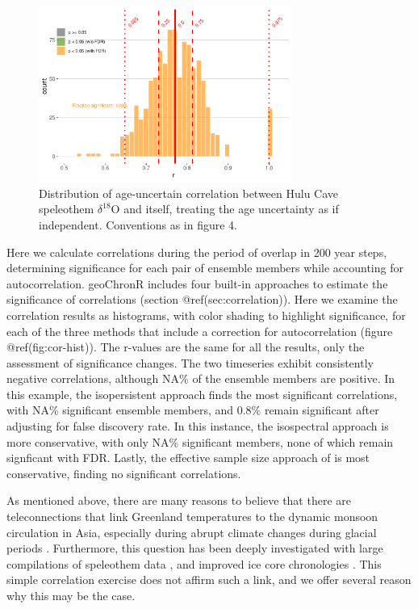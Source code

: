 \documentclass[gchron, manuscript]{copernicus}
\begin{document}
\begin{figure}
\includegraphics[width=8.3cm]{geoChronR-paper_files/figure-latex/hulu-cor-hist-1} \caption{Distribution of age-uncertain correlation between Hulu Cave speleothem $\delta^{18}$O and itself, treating the age uncertainty as if independent. Conventions as in figure 4.}\label{fig:hulu-cor-hist}
\end{figure}

Here we calculate correlations during the period of overlap in 200 year
steps, determining significance for each pair of ensemble members while
accounting for autocorrelation. geoChronR includes four built-in
approaches to estimate the significance of correlations (section
@ref(sec:correlation)). Here we examine the correlation results as
histograms, with color shading to highlight significance, for each of
the three methods that include a correction for autocorrelation (figure
@ref(fig:cor-hist)). The r-values are the same for all the results, only
the assessment of significance changes. The two timeseries exhibit
consistently negative correlations, although NA\% of the ensemble
members are positive. In this example, the isopersistent approach finds
the most significant correlations, with NA\% significant ensemble
members, and 0.8\% remain significant after adjusting for false
discovery rate. In this instance, the isospectral approach is more
conservative, with only NA\% significant members, none of which remain
signficant with FDR. Lastly, the effective sample size approach of
\citet{dawdy1964statistical} is most conservative, finding no
significant correlations.

As mentioned above, there are many reasons to believe that there are
teleconnections that link Greenland temperatures to the dynamic monsoon
circulation in Asia, especially during abrupt climate changes during
glacial periods
\citep[e.g.][]{liu2013links, duan2016onset, zhang2019asian}.
Furthermore, this question has been deeply investigated with large
compilations of speleothem data \citep{corrick2020synchronous}, and
improved ice core chronologies
\citep[e.g.][]{andersen2006greenland, wolff2010millennial}. This simple
correlation exercise does not affirm such a link, and we offer several
reason why this may be the case.
\end{document}
